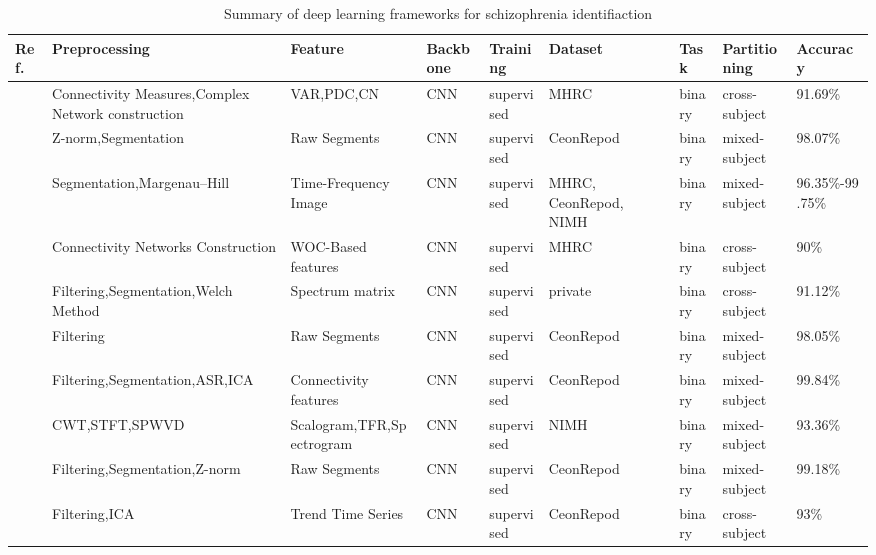 \begin{table*}[ht]
\renewcommand{\arraystretch}{1.2}
\caption{Summary of deep learning frameworks for schizophrenia identifiaction}
\label{tab:schis}
\footnotesize
\begin{tabular}{p{0.4cm}p{2.8cm}p{2cm}p{1.5cm}p{1.9cm}p{1.9cm}p{0.8cm}p{1.8cm}p{2cm}}
\hline
\textbf{Ref.} & \textbf{Preprocessing} & \textbf{Feature} & \textbf{Backbone} & \textbf{Training} & \textbf{Dataset} & \textbf{Task} & \textbf{Partitioning} & \textbf{Accuracy} \\
\hline
~\cite{phang2019multi} & Connectivity Measures,Complex Network construction & VAR,PDC,CN & CNN & supervised & MHRC & binary & cross-subject & 91.69\% \\
~\cite{SZ2} & Z-norm,Segmentation & Raw Segments & CNN & supervised & CeonRepod & binary & mixed-subject & 98.07\% \\
~\cite{SZ3} & Segmentation,\newline Margenau–Hill & Time-Frequency Image & CNN & supervised & MHRC, \newline CeonRepod, \newline NIMH & binary & mixed-subject & 96.35\%-99.75\% \\
~\cite{SZ4} & Connectivity Networks Construction & WOC-Based \newline features & CNN & supervised & MHRC & binary & cross-subject & 90\% \\
~\cite{SZ5} & Filtering,Segmentation,\newline Welch Method & Spectrum matrix & CNN & supervised & private & binary & cross-subject & 91.12\% \\
~\cite{SZ6} & Filtering & Raw Segments & CNN & supervised & CeonRepod & binary & mixed-subject & 98.05\% \\
~\cite{10023506} & Filtering,Segmentation,\newline ASR,ICA & Connectivity \newline features & CNN & supervised & CeonRepod & binary & mixed-subject &  99.84\% \\
~\cite{SZ8} & CWT,STFT,SPWVD & Scalogram,TFR,\newline Spectrogram & CNN & supervised & NIMH & binary & mixed-subject &  93.36\% \\
~\cite{SZ9} & Filtering,Segmentation,\newline Z-norm & Raw Segments & CNN & supervised & CeonRepod & binary & mixed-subject & 99.18\% \\
~\cite{SZ10} & Filtering,ICA & Trend Time \newline Series & CNN & supervised & CeonRepod & binary & cross-subject & 93\% \\

\end{tabular}
\end{table*}
